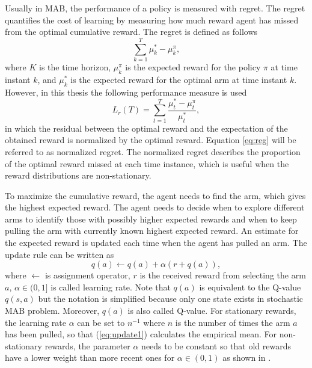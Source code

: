 \documentclass[english, 12pt, a4paper, elec, utf8, a-1b, online]{aaltothesis}
\newcommand{\regret}{L_r}
\begin{document}
Usually in MAB, the performance of a policy is measured with regret.
The regret quantifies the cost of learning by measuring how much reward agent has missed from the optimal cumulative reward.
The regret is defined as follows
\begin{equation*}
    \sum_{k=1}^T \mu^*_k - \mu^\pi_k,
\end{equation*}
where $K$ is the time horizon, $\mu^\pi_k$ is the expected reward for the policy $\pi$ at time instant $k$, and $\mu_k^*$ is the expected reward for the optimal arm at time instant $k$.
However, in this thesis the following performance measure is used
\begin{equation}\label{eq:reg}
    \regret(T) = \sum_{t=1}^T \frac{\mu^*_t - \mu^\pi_t}{\mu^*_t},
\end{equation}
in which the residual between the optimal reward and the expectation of the obtained reward is normalized by the optimal reward.
Equation \eqref{eq:reg} will be referred to as normalized regret.
The normalized regret describes the proportion of the optimal reward missed at each time instance, which is useful when the reward distributions are non-stationary.

To maximize the cumulative reward, the agent needs to find the arm, which gives the highest expected reward.
The agent needs to decide when to explore different arms to identify those with possibly higher expected rewards and when to keep pulling the arm with currently known highest expected reward.
An estimate for the expected reward is updated each time when the agent has pulled an arm.
The update rule can be written as
\begin{equation}\label{eq:update1}
    q(a) \leftarrow q(a) + \alpha \left(r + q(a)\right),
\end{equation}
where $\leftarrow$ is assignment operator, $r$ is the received reward from selecting the arm $a$, $\alpha \in (0, 1]$ is called learning rate.
Note that $q(a)$ is equivalent to the Q-value $q(s, a)$ but the notation is simplified because only one state exists in stochastic MAB problem.
Moreover, $q(a)$ is also called Q-value.
For stationary rewards, the learning rate $\alpha$ can be set to $n^{-1}$ where $n$ is the number of times the arm $a$ has been pulled, so that (\ref{eq:update1}) calculates the empirical mean. 
For non-stationary rewards, the parameter $\alpha$ needs to be constant so that old rewards have a lower weight than more recent ones for $\alpha \in (0, 1)$ as shown in \cite{Sutton2018}.
\end{document}
